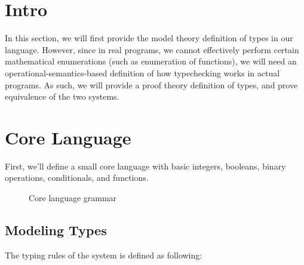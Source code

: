 \section{Intro}

In this section, we will first provide the model theory definition of types in 
our language. However, since in real programs, we cannot effectively perform 
certain mathematical enumerations (such as enumeration of functions), we will 
need an operational-semantics-based definition of how typechecking works in actual 
programs. As such, we will provide a proof theory definition of types, and prove
equivalence of the two systems.

\section{Core Language}

First, we'll define a small core language with basic integers, booleans, binary 
operations, conditionals, and functions.

\begin{figure}[hbt!]%
  \begin{grammar}
            \grule[types]{\syntype}{
              \tint
              \gor \tbool
              \gor \tfun
          }
        \end{grammar}
    \caption{Core language grammar}
    \label{fig_Grammar}
\end{figure}

\subsection{Modeling Types}

The typing rules of the system is defined as following:

